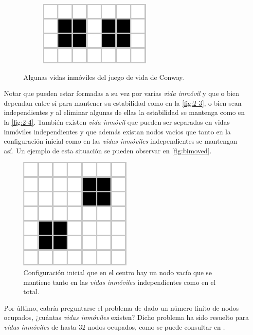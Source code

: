 \documentclass[../proyecto.tex]{memoir}
\begin{document}
\begin{figure}[H]
\begin{subfigure}[b]{0.3\linewidth}
        \caption{}
        \label{fig:2-3}
    \end{subfigure}
    \quad
	\begin{subfigure}[b]{0.3\linewidth} 
        \centering
        \includegraphics[height=.35\linewidth]{./images/biblock.png}
        \caption{}
        \label{fig:2-4}
    \end{subfigure}
	\caption{Algunas vidas inmóviles del juego de vida de Conway.}
	\label{fig:inmoviles}
\end{figure} 


Notar que pueden estar formadas a su vez por varias \textit{vida inmóvil} y que o bien dependan entre sí para mantener su estabilidad como en la \autoref{fig:2-3}, o bien sean independientes y al eliminar algunas de ellas la estabilidad se mantenga como en la \autoref{fig:2-4}. También existen \textit{vida inmóvil} que pueden ser separadas en vidas inmóviles independientes y que además existan nodos vacíos que tanto en la configuración inicial como en las \textit{vidas inmóviles} independientes se mantengan así. Un ejemplo de esta situación se pueden observar en \autoref{fig:bimoved}.

\begin{figure}[H]
	\centering
	\includegraphics[height=.2\linewidth]{./images/bimoved.png}
	\caption{Configuración inicial que en el centro hay un nodo vacío que se mantiene tanto en las \textit{vidas inmóviles} independientes como en el total.}
	\label{fig:bimoved}
\end{figure} 

Por último, cabría preguntarse el problema de dado un número finito de nodos ocupados, ¿cuántas \textit{vidas inmóviles} existen? Dicho problema ha sido resuelto para \textit{vidas inmóviles} de hasta 32 nodos ocupados, como se puede consultar en \cite{countStillLifes}.
\end{document}
